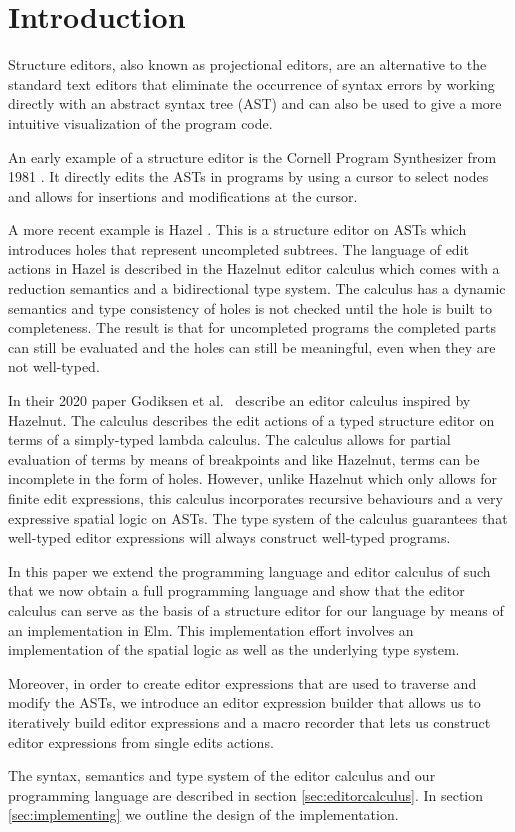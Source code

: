 \section{Introduction}
\label{introduction}

Structure editors, also known as projectional editors, are an
alternative to the standard text editors that eliminate the occurrence
of syntax errors by working directly with an abstract syntax tree
(AST) and can also be used to give a more intuitive visualization of
the program code.

An early example of a structure editor is the Cornell Program Synthesizer
from 1981 \cornell. It directly edits the ASTs in programs by using a cursor to
select nodes and allows for insertions and modifications at the cursor. 

A more recent example is Hazel \hazel. This is a structure editor on
ASTs which introduces holes that represent uncompleted subtrees. The
language of edit actions in Hazel is described in the Hazelnut editor
calculus which comes with a reduction semantics and a bidirectional
type system. The calculus has a dynamic semantics and type consistency
of holes is not checked until the hole is built to completeness. The
result is that for uncompleted programs the completed parts can still
be evaluated and the holes can still be meaningful, even when they are
not well-typed.

In their 2020 paper Godiksen et al. \pepm~describe an editor calculus
inspired by Hazelnut. The calculus describes the edit actions of a
typed structure editor on terms of a simply-typed lambda calculus. The
calculus allows for partial evaluation of terms by means of
breakpoints and like Hazelnut, terms can be incomplete in the form of
holes. However, unlike Hazelnut which only allows for finite edit
expressions, this calculus incorporates recursive behaviours and a
very expressive spatial logic on ASTs. The type system of the calculus 
guarantees that well-typed editor expressions will always construct
well-typed programs.

In this paper we extend the programming language and editor calculus
of \pepm such that we now obtain a full programming language and show
that the editor calculus can serve as the basis of a structure editor
for our language by means of an implementation in Elm. This
implementation effort involves an implementation of the spatial logic
as well as the underlying type system.

Moreover, in order to create editor expressions that are used to
traverse and modify the ASTs, we introduce an editor expression
builder that allows us to iteratively build editor expressions and a
macro recorder that lets us construct editor expressions from single
edits actions.

The syntax, semantics and type system of the editor calculus and our
programming language are described in section
\ref{sec:editorcalculus}. In section \ref{sec:implementing} we outline
the design of the implementation.


